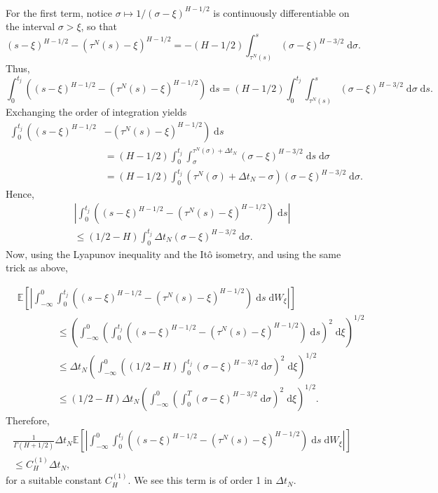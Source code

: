 \documentclass[reqno,12pt]{amsart}
\theoremstyle{plain} %
\theoremstyle{definition} %
\begin{document}
For the first term, notice $\sigma \mapsto 1/(\sigma - \xi)^{H-1/2}$ is continuously differentiable on the interval $\sigma > \xi$, so that
\[
    (s-\xi)^{H-1/2} - (\tau^N(s)-\xi)^{H-1/2} = - (H-1/2)\int_{\tau^N(s)}^s (\sigma - \xi)^{H - 3/2} \;\mathrm{d}\sigma.
\]
Thus,
\[
    \int_{0}^{t_j} \left( (s-\xi)^{H-1/2} - (\tau^N(s)-\xi)^{H-1/2}\right) \;\mathrm{d}s = (H-1/2)\int_{0}^{t_j} \int_{\tau^N(s)}^s (\sigma - \xi)^{H - 3/2} \;\mathrm{d}\sigma \;\mathrm{d}s.
\]
Exchanging the order of integration yields
\begin{align*}
    \int_{0}^{t_j} \left( (s-\xi)^{H-1/2} \right. & \left. - (\tau^N(s)-\xi)^{H-1/2} \right) \;\mathrm{d}s \\
    & = (H-1/2)\int_{0}^{t_j} \int_{\sigma}^{\tau^N(\sigma) + \Delta t_N} (\sigma - \xi)^{H - 3/2} \;\mathrm{d}s \;\mathrm{d}\sigma \\
    & = (H-1/2)\int_{0}^{t_j} \left(\tau^N(\sigma) + \Delta t_N - \sigma\right) (\sigma - \xi)^{H - 3/2} \;\mathrm{d}\sigma.
\end{align*}
Hence,
\begin{multline*}
    \left|\int_{0}^{t_j} \left( (s-\xi)^{H-1/2} - (\tau^N(s)-\xi)^{H-1/2} \right) \;\mathrm{d}s\right| \\
    \leq (1/2 - H)\int_{0}^{t_j} \Delta t_N (\sigma - \xi)^{H - 3/2} \;\mathrm{d}\sigma.
\end{multline*}
Now, using the Lyapunov inequality and the It\^o isometry, and using the same trick as above,

\begin{align*}
    & \mathbb{E}\left[\left|\int_{-\infty}^{0} \int_{0}^{t_j} \left( (s-\xi)^{H-1/2} - (\tau^N(s)-\xi)^{H-1/2}\right) \;\mathrm{d}s \;\mathrm{d}W_\xi \right|\right] \\
    & \qquad\qquad \leq \left(\int_{-\infty}^{0} \left(\int_{0}^{t_j} \left( (s-\xi)^{H-1/2} - (\tau^N(s)-\xi)^{H-1/2}\right) \;\mathrm{d}s \right)^2 \;\mathrm{d}\xi \right)^{1/2} \\
    & \qquad\qquad \leq \Delta t_N \left(\int_{-\infty}^{0} \left( (1/2 - H)\int_0^{t_j} (\sigma - \xi)^{H-3/2} \;\mathrm{d}\sigma \right)^2 \;\mathrm{d}\xi \right)^{1/2} \\
    & \qquad\qquad \leq (1/2 - H)\Delta t_N \left(\int_{-\infty}^{0} \left(\int_0^T (\sigma - \xi)^{H-3/2} \;\mathrm{d}\sigma \right)^2 \;\mathrm{d}\xi \right)^{1/2}.
\end{align*}
Therefore,
\begin{multline}
    \label{firsttermfBm}
    \frac{1}{\Gamma(H + 1/2)}\Delta t_N \mathbb{E}\left[\left|\int_{-\infty}^{0} \int_{0}^{t_j} \left( (s-\xi)^{H-1/2} - (\tau^N(s)-\xi)^{H-1/2}\right) \;\mathrm{d}s \;\mathrm{d}W_\xi \right|\right] \\
    \leq C_H^{(1)}\Delta t_N,
\end{multline}
for a suitable constant $C_H^{(1)}$. We see this term is of order 1 in $\Delta t_N.$
\end{document}
